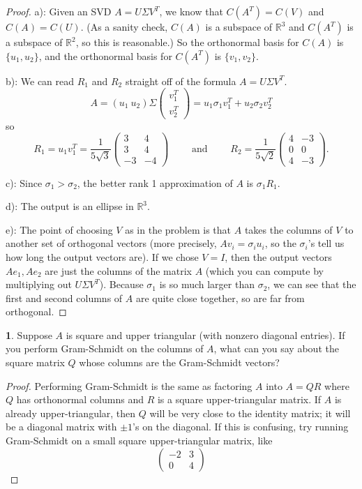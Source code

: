 \documentclass{article}
\theoremstyle{definition}
\newtheorem{prob}{}
\begin{document}
\begin{proof}
	a): Given an SVD $A=U \Sigma V^T$, we know that $C(A^T)=C(V)$ and $C(A)= C(U)$. (As a sanity check, $C(A)$ is a subspace of $\mathbb{R}^3$ and $C(A^T)$ is a subspace of $\mathbb{R}^2$, so this is reasonable.) So the orthonormal basis for $C(A)$ is $\{u_1, u_2\}$, and the orthonormal basis for $C(A^T)$ is $\{v_1, v_2\}$.
	
	b): We can read $R_1$ and $R_2$ straight off of the formula $A=U \Sigma V^T$.
	\[A= (u_1 \ u_2) \Sigma \begin{pmatrix}
		v_1^T \\
		v_2^T
	\end{pmatrix}= u_1 \sigma_1 v_1^T + u_2 \sigma_2 v_2^T\]
so
\[R_1=u_1 v_1^T= \frac{1}{5\sqrt{3}}\begin{pmatrix}
	3 & 4\\ 3 & 4\\ -3 & -4
\end{pmatrix} \qquad \text{ and } \qquad R_2=\frac{1}{5 \sqrt{2}} \begin{pmatrix}
4 & -3\\ 0 & 0\\4 & -3
\end{pmatrix}.\]

c): Since $\sigma_1 > \sigma_2$, the better rank 1 approximation of $A$ is $\sigma_1 R_1$.

d): The output is an ellipse in $\mathbb{R}^3$. 

e): The point of choosing $V$ as in the problem is that $A$ takes the columns of $V$ to another set of orthogonal vectors (more precisely, $Av_i= \sigma_i u_i$, so the $\sigma_i$'s tell us how long the output vectors are). If we chose $V=I$, then the output vectors $Ae_1, Ae_2$ are just the columns of the matrix $A$ (which you can compute by multiplying out $U \Sigma V^T$). Because $\sigma_1$ is so much larger than $\sigma_2$, we can see that the first and second columns of $A$ are quite close together, so are far from orthogonal.
\end{proof}

\begin{prob}
	Suppose $A$ is square and upper triangular (with nonzero diagonal entries). If you perform Gram-Schmidt on the columns of $A$, what can you say about the square matrix $Q$ whose columns are the Gram-Schmidt vectors?
\end{prob}

\begin{proof}
	Performing Gram-Schmidt is the same as factoring $A$ into $A=QR$ where $Q$ has orthonormal columns and $R$ is a square upper-triangular matrix. If $A$ is already upper-triangular, then $Q$ will be very close to the identity matrix; it will be a diagonal matrix with $\pm1$'s on the diagonal. If this is confusing, try running Gram-Schmidt on a small square upper-triangular matrix, like 
	\[\begin{pmatrix}
		-2& 3\\
		0 &4
	\end{pmatrix}\]
\end{proof}
\end{document}
